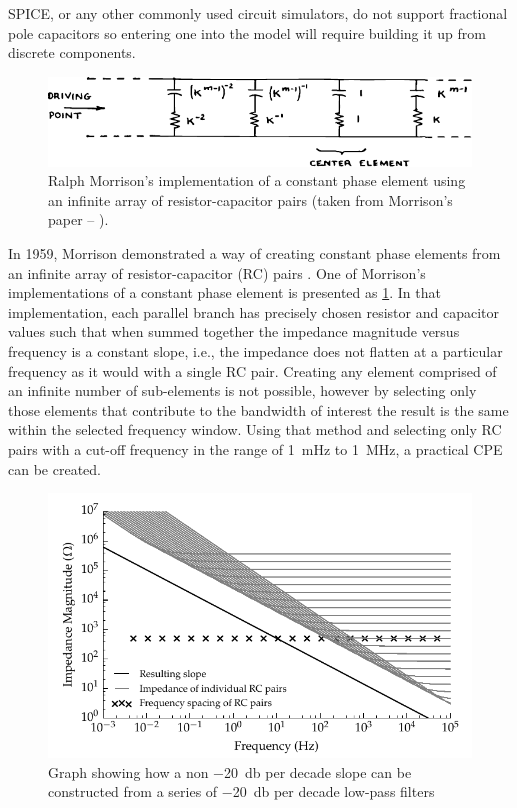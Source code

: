     SPICE, or any other commonly used circuit simulators, do not support fractional pole capacitors so entering one into the model will require building it up from discrete components.
    \begin{figure}[h]
      \centering
      \includegraphics{content/pt2/07-InterfaceModel/graphics/Morrison-RC}
      \caption{\label{graph:pt2-morrisonCPE}Ralph Morrison's implementation of a constant phase element using an infinite array of resistor-capacitor pairs (taken from Morrison's paper -- \cite{Morrison1959}).}
    \end{figure}
    In 1959, Morrison demonstrated a way of creating constant phase elements from an infinite array of resistor-capacitor (RC) pairs \cite{Morrison1959}.
    One of Morrison's implementations of a constant phase element is presented as \cref{graph:pt2-morrisonCPE}.
    In that implementation, each parallel branch has precisely chosen resistor and capacitor values such that when summed together the impedance magnitude versus frequency is a constant slope, i.e., the impedance does not flatten at a particular frequency as it would with a single RC pair.
    Creating any element comprised of an infinite number of sub-elements is not possible, however by selecting only those elements that contribute to the bandwidth of interest the result is the same within the selected frequency window.
    Using that method and selecting only RC pairs with a cut-off frequency in the range of \SI{1}{\milli\hertz} to \SI{1}{\mega\hertz}, a practical CPE can be created.

    \begin{figure}
      \centering
      \includegraphics{content/pt2/07-InterfaceModel/graphics/graph_cpe_creation}
      \caption{\label{graph:pt2-cpe_creation}Graph showing how a non \SI{-20}{\decibel} per decade slope can be constructed from a series of \SI{-20}{\decibel} per decade low-pass filters}
    \end{figure}

